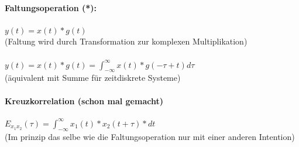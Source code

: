 \documentclass{article}
\begin{document}
\paragraph{Faltungsoperation (*):}
\begin{center}
$ y(t) = x(t) * g(t)$ \\
(Faltung wird durch Transformation zur komplexen Multiplikation) \\
\mbox{} \\
$y(t) = x(t) * g(t) = \int_{-\infty}^{\infty} x(t) * g(-\tau + t) d\tau$ \\
(äquivalent mit Summe für zeitdiskrete Systeme)
\end{center}

\paragraph{Kreuzkorrelation (schon mal gemacht)}
\begin{center}
$E_{x_1x_2}(\tau) = \int_{-\infty}^{\infty} x_1(t) * x_2(t + \tau) * dt$ \\
(Im prinzip das selbe wie die Faltungsoperation nur mit einer anderen Intention)
\end{center}
\end{document}

